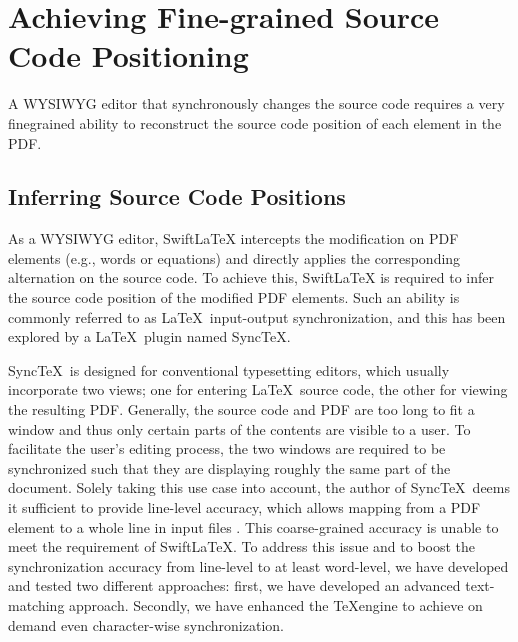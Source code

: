 \documentclass[sigconf]{acmart}
\begin{document}









\section{Achieving Fine-grained Source Code Positioning}  \label{sect:textpos}
A WYSIWYG editor that synchronously changes the source code  requires a very finegrained ability to reconstruct the source code position of each element in the PDF.

\subsection{Inferring Source Code Positions}
As a WYSIWYG editor, SwiftLaTeX intercepts the modification on PDF elements (e.g., words or equations) and directly applies the corresponding alternation on the source code. To achieve this, SwiftLaTeX is required to infer the source code position of the modified PDF elements. 
Such an ability is commonly referred to as \LaTeX\ input-output synchronization, and this has been explored by a \LaTeX\ plugin named Sync\TeX. 

Sync\TeX\ is  designed for conventional typesetting editors, which usually incorporate two views; 
one for entering \LaTeX\ source code, the other for viewing the resulting PDF. 
Generally, the source code and PDF are too long to fit a window and thus only certain parts of the contents are visible to a user. 
To facilitate the user's editing process, the two windows are required to be synchronized such that they are displaying roughly the same part of the document. 
Solely taking this use case into account, the author of Sync\TeX\ deems it sufficient to provide line-level accuracy, which allows mapping from a PDF element to a whole line in input files \cite{laurens2008direct}. 
This coarse-grained accuracy is unable to meet the requirement of SwiftLaTeX. To address this issue and to boost the synchronization accuracy from line-level to at least  word-level, we have developed and tested two different approaches: first, we have developed an advanced text-matching approach. Secondly, we have enhanced the \TeX engine to achieve on demand even character-wise synchronization.
\end{document}
